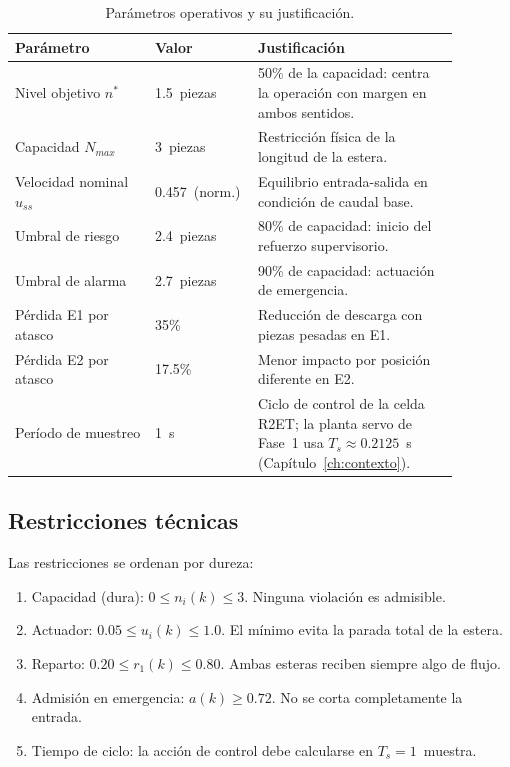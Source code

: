 \begin{table}[H]
\centering
\small
\caption{Parámetros operativos y su justificación.}
\label{tab:params_op}
\begin{tabular}{@{}P{0.30\linewidth}P{0.15\linewidth}P{0.43\linewidth}@{}}
\toprule
Parámetro & Valor & Justificación \\ \midrule
Nivel objetivo $n^*$ & 1.5~piezas & 50\% de la capacidad: centra la operación con margen en ambos sentidos.\\
Capacidad $N_{max}$ & 3~piezas & Restricción física de la longitud de la estera.\\
Velocidad nominal $u_{ss}$ & 0.457~(norm.) & Equilibrio entrada-salida en condición de caudal base.\\
Umbral de riesgo & 2.4~piezas & 80\% de capacidad: inicio del refuerzo supervisorio.\\
Umbral de alarma & 2.7~piezas & 90\% de capacidad: actuación de emergencia.\\
Pérdida E1 por atasco & 35\% & Reducción de descarga con piezas pesadas en E1.\\
Pérdida E2 por atasco & 17.5\% & Menor impacto por posición diferente en E2.\\
Período de muestreo & 1~s & Ciclo de control de la celda R2ET; la planta servo de Fase~1 usa $T_s \approx 0.2125$~s (Capítulo~\ref{ch:contexto}).\\
\bottomrule
\end{tabular}
\end{table}

\subsection*{Restricciones técnicas}

Las restricciones se ordenan por dureza:

\begin{enumerate}
  \item Capacidad (dura): $0 \leq n_i(k) \leq 3$. Ninguna violación es admisible.
  \item Actuador: $0.05 \leq u_i(k) \leq 1.0$. El mínimo evita la parada total de la estera.
  \item Reparto: $0.20 \leq r_1(k) \leq 0.80$. Ambas esteras reciben siempre algo de flujo.
  \item Admisión en emergencia: $a(k) \geq 0.72$. No se corta completamente la entrada.
  \item Tiempo de ciclo: la acción de control debe calcularse en $T_s=1$~muestra.
\end{enumerate}

